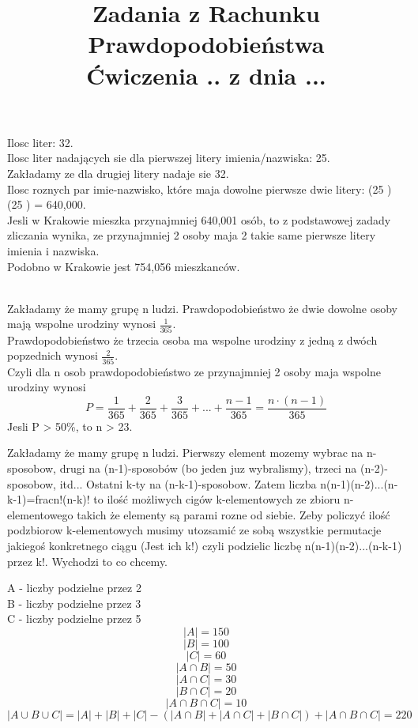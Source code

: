 \documentclass[fleqn]{article}
\begin{document}
\title{Zadania z Rachunku Prawdopodobieństwa \\ Ćwiczenia .. z dnia ...}
\date{}
\medskip
{}
\medskip

Ilosc liter: 32. \\
Ilosc liter nadających sie dla pierwszej litery imienia/nazwiska: 25. \\
Zakładamy ze dla drugiej litery nadaje sie 32. \\
Ilosc roznych par imie-nazwisko, które maja dowolne pierwsze dwie litery: (25 ) \cdot (25 ) = 640,000. \\
Jesli w Krakowie mieszka przynajmniej 640,001 osób, to z podstawowej zadady zliczania wynika, ze przynajmniej 2 osoby maja 2 takie same pierwsze litery imienia i nazwiska. \\
Podobno w Krakowie jest 754,056 mieszkanców. \\
\\

\medskip

Zakładamy że mamy grupę n ludzi.
Prawdopodobieństwo że dwie dowolne osoby mają wspolne urodziny wynosi $\frac{1}{365}$.\\
Prawdopodobieństwo że trzecia osoba ma wspolne urodziny z jedną z dwóch popzednich wynosi $\frac{2}{365}$.\\
Czyli dla n osob prawdopodobieństwo ze przynajmniej 2 osoby maja wspolne urodziny wynosi
\[P = \frac{1}{365} + \frac{2}{365} + \frac{3}{365} + ... + \frac{n - 1}{365} = \frac{n\cdot(n-1)}{365}\]
Jesli P > 50\%, to n > 23.
\medskip

\medskip

Zakładamy że mamy grupę n ludzi.
Pierwszy element mozemy wybrac na n-sposobow, drugi na (n-1)-sposobów (bo jeden juz wybralismy), trzeci na (n-2)- sposobow, itd... Ostatni k-ty na (n-k-1)-sposobow. Zatem liczba n(n-1)(n-2)...(n-k-1)=frac{n!}{(n-k)!} to ilość możliwych cigów k-elementowych ze zbioru n-elementowego takich że elementy są parami rozne od siebie. Zeby policzyć ilość podzbiorow k-elementowych musimy utozsamić ze sobą wszystkie permutacje jakiegoś konkretnego ciągu (Jest ich k!) czyli podzielic liczbę n(n-1)(n-2)...(n-k-1) przez k!. Wychodzi to co chcemy.
\medskip


\medskip

A - liczby podzielne przez 2 \\
B - liczby podzielne przez 3 \\
C - liczby podzielne przez 5 \\
\[|A| = 150\]
\[|B| = 100\]
\[|C| = 60 \]
\[|A \cap B| = 50\]
\[|A \cap C| = 30\]
\[|B \cap C| = 20\]
\[|A \cap B \cap C| = 10\]
\[|A \cup B \cup C| = |A| + |B| + |C| - (|A \cap B|  + |A \cap C| + |B \cap C|) + |A \cap B \cap C| = 220 \]
\end{document}
